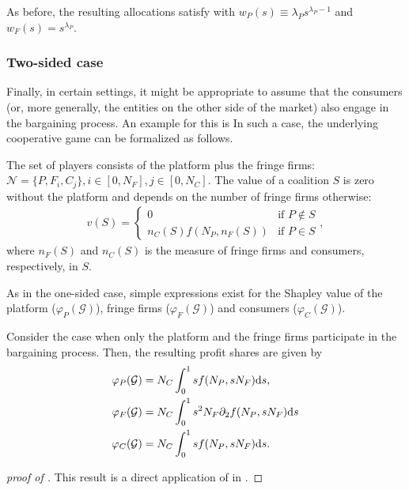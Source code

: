 As before, the resulting allocations satisfy  with $w_P(s) \equiv \lambda_P s ^ {\lambda_P - 1}$ and $w_F(s) = s ^ {\lambda_P}$.


\subsubsection{Two-sided case}
\label{sec:cooperative_game_two_sided}

Finally, in certain settings, it might be appropriate to assume that the consumers (or, more generally, the entities on the other side of the market) also engage in the bargaining process.
An example for this is 
In such a case, the underlying cooperative game can be formalized as follows.

The set of players consists of the platform plus the fringe firms: $\mathcal{N} = \{P, F_i, C_j\}, i \in [0, N_F], j \in [0, N_C]$.
The value of a coalition $S$ is zero without the platform and depends on the number of fringe firms otherwise:
\begin{align*}
    v(S) = \begin{cases}
        0 & \text{if } P \notin S \\
        n_C(S) f(N_P, n_F(S)) & \text{if } P \in S
    \end{cases},
\end{align*}
where $n_F(S)$ and $n_C(S)$ is the measure of fringe firms and consumers, respectively, in $S$.

As in the one-sided case, simple expressions exist for the Shapley value of the platform ($\varphi_P(\mathcal{G})$), fringe firms ($\varphi_F(\mathcal{G})$) and consumers ($\varphi_C(\mathcal{G})$).

\begin{proposition}
    \label{prop:profit_sharing_two_sided}
    Consider the case when only the platform and the fringe firms participate in the bargaining process.
    Then, the resulting profit shares are given by
    \begin{align*}
        \varphi_P(\mathcal{G}) &= N_C \int_0^1 s f(N_P, s N_F) \mathrm{d}s, \\
        \varphi_F(\mathcal{G}) &= N_C \int_0^1 s^2 N_F \partial_2 f(N_P, s N_F) \mathrm{d}s \\
        \varphi_C(\mathcal{G}) &= N_C \int_0^1 s f(N_P, s N_F) \mathrm{d}s.
    \end{align*}
\end{proposition}
\begin{proof}[proof of ]
    This result is a direct application of \proptwosided{} in \theoryref{}.
\end{proof}

